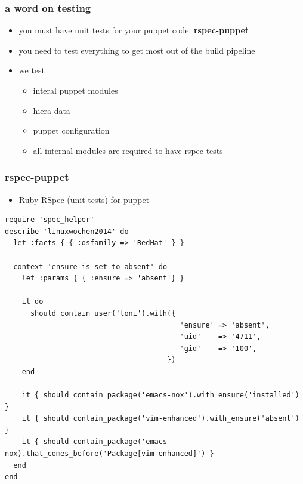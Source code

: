 \documentclass{beamer}
\begin{document}
\begin{frame}
  \frametitle{a word on testing}

  \begin{itemize}
  \item you must have unit tests for your puppet code: \textbf{rspec-puppet}
  \item you need to test everything to get most out of the build
    pipeline
  \item we test
    \begin{itemize}
    \item interal puppet modules
    \item hiera data
    \item puppet configuration
    \item all internal modules are required to have rspec tests
    \end{itemize}
  \end{itemize}
\end{frame}

\begin{frame}[fragile]
  \frametitle{rspec-puppet}

  \begin{itemize}
  \item Ruby RSpec (unit tests) for puppet
  \end{itemize}

  \begin{lstlisting}
require 'spec_helper'
describe 'linuxwochen2014' do
  let :facts { { :osfamily => 'RedHat' } }

  context 'ensure is set to absent' do
    let :params { { :ensure => 'absent'} }

    it do
      should contain_user('toni').with({
                                         'ensure' => 'absent',
                                         'uid'    => '4711',
                                         'gid'    => '100',
                                      })
    end

    it { should contain_package('emacs-nox').with_ensure('installed') }
    it { should contain_package('vim-enhanced').with_ensure('absent') }
    it { should contain_package('emacs-nox).that_comes_before('Package[vim-enhanced]') }
  end
end
  \end{lstlisting}

\end{frame}

\begin{frame}
\end{frame}

\begin{frame}
\end{frame}
\end{document}
